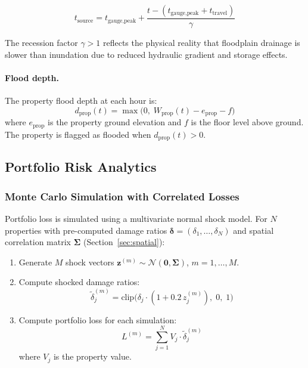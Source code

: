 \documentclass[11pt,a4paper]{article}
\begin{document}
\begin{equation}
    t_{\text{source}} = t_{\text{gauge,peak}} +
    \frac{t - (t_{\text{gauge,peak}} + t_{\text{travel}})}{\gamma}
    \label{eq:recession}
\end{equation}

\noindent The recession factor $\gamma > 1$ reflects the physical reality that floodplain
drainage is slower than inundation due to reduced hydraulic gradient and storage effects.

\paragraph{Flood depth.} The property flood depth at each hour is:
\begin{equation}
    d_{\text{prop}}(t) = \max\!\big(0, \; W_{\text{prop}}(t) - e_{\text{prop}} - f\big)
    \label{eq:prop_depth}
\end{equation}
\noindent where $e_{\text{prop}}$ is the property ground elevation and $f$ is the floor
level above ground. The property is flagged as flooded when $d_{\text{prop}}(t) > 0$.

\subsection{Portfolio Risk Analytics}
\label{sec:risk_analytics}

\subsubsection{Monte Carlo Simulation with Correlated Losses}

Portfolio loss is simulated using a multivariate normal shock model. For $N$ properties
with pre-computed damage ratios $\boldsymbol{\delta} = (\delta_1, \ldots, \delta_N)$ and
spatial correlation matrix $\boldsymbol{\Sigma}$ (Section~\ref{sec:spatial}):

\begin{enumerate}[nosep]
    \item Generate $M$ shock vectors
          $\boldsymbol{z}^{(m)} \sim \mathcal{N}(\mathbf{0}, \boldsymbol{\Sigma})$,
          $m = 1, \ldots, M$.
    \item Compute shocked damage ratios:
          \begin{equation}
              \tilde{\delta}_j^{(m)} = \text{clip}\!\big(\delta_j \cdot (1 + 0.2 \, z_j^{(m)}),
              \; 0, \; 1\big)
              \label{eq:shocked_damage}
          \end{equation}
    \item Compute portfolio loss for each simulation:
          \begin{equation}
              L^{(m)} = \sum_{j=1}^{N} V_j \cdot \tilde{\delta}_j^{(m)}
              \label{eq:portfolio_loss}
          \end{equation}
          where $V_j$ is the property value.
\end{enumerate}
\end{document}
